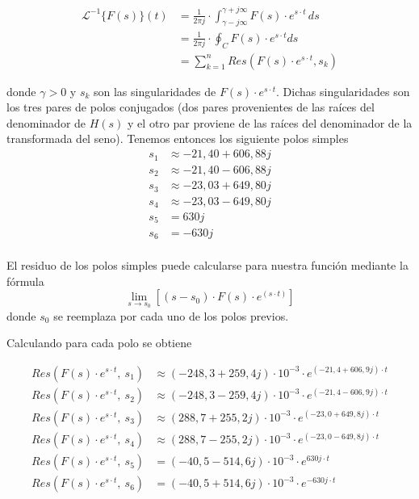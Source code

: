 \documentclass[11pt,a4paper]{report}
\begin{document}
\begin{align*}
\mathcal{L}^{-1}\{F(s)\}(t)&=\frac{1}{2\pi j} \cdot \int_{\gamma-j\infty}^{\gamma+j\infty} F(s) \cdot e^{s \cdot t}\, ds \\
&=\frac{1}{2\pi j} \cdot \oint_C  F(s) \cdot e^{s \cdot t} ds\\ &= \sum_{k=1}^{n} Res(F(s) \cdot e^{s \cdot t}, s_{k})
\end{align*}

donde $\gamma > 0$ y $s_{k}$ son las singularidades de $F(s) \cdot e^{s \cdot t}$.
Dichas singularidades son los tres pares de polos conjugados (dos pares provenientes de las raíces del denominador de $H(s)$ y el otro par proviene de las raíces del denominador de la transformada del seno). Tenemos entonces los siguiente polos simples
\begin{align*}
s_{1} &\approx -21,40 + 606,88j\\
s_{2} &\approx -21,40 - 606,88j\\
s_{3} &\approx -23,03 + 649,80j\\
s_{4} &\approx -23,03 - 649,80j\\
s_{5} &= 630j\\
s_{6} &= -630j\\
\end{align*}

\newpage
El residuo de los polos simples puede calcularse para nuestra función mediante la fórmula
\[\lim_{s \to s_{0}} [(s-s_{0}) \cdot F(s) \cdot e^{(s \cdot t)}]\]
donde $s_{0}$ se reemplaza por cada uno de los polos previos.

\bigskip
Calculando para cada polo se obtiene

\begin{align*}
Res(F(s) \cdot e^{s \cdot t}, \ s_{1}) &\approx (-248,3 + 259,4j) \cdot 10^{-3} \cdot e^{(-21,4 + 606,9j) \cdot t}\\
Res(F(s) \cdot e^{s \cdot t}, \ s_{2}) &\approx (-248,3 - 259,4j) \cdot 10^{-3} \cdot e^{(-21,4 - 606,9j) \cdot t}\\
Res(F(s) \cdot e^{s \cdot t}, \ s_{3}) &\approx (288,7 + 255,2j) \cdot 10^{-3} \cdot e^{(-23,0 + 649,8j) \cdot t}\\
Res(F(s) \cdot e^{s \cdot t}, \ s_{4}) &\approx (288,7 - 255,2j) \cdot 10^{-3} \cdot e^{(-23,0 - 649,8j) \cdot t}\\
Res(F(s) \cdot e^{s \cdot t}, \ s_{5}) &= (-40,5 - 514,6j) \cdot 10^{-3} \cdot e^{630j \cdot t}\\
Res(F(s) \cdot e^{s \cdot t}, \ s_{6}) &= (-40,5 + 514,6j) \cdot 10^{-3} \cdot e^{-630j \cdot t}\\
\end{align*}
\end{document}
